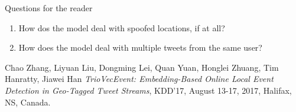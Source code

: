 \documentclass[12pt]{article}
\theoremstyle{remark}
\begin{document}
	Questions for the reader
	\begin{enumerate}
		\item How dos the model deal with spoofed locations, if at all?
		\item How does the model deal with multiple tweets from the same user?
	\end{enumerate}
	\vspace{0.5cm}
	
	\begin{thebibliography}{unsrt}
		Chao Zhang, Liyuan Liu, Dongming Lei, Quan Yuan, Honglei Zhuang, Tim Hanratty, Jiawei Han \emph{TrioVecEvent: Embedding-Based Online Local Event Detection
			in Geo-Tagged Tweet Streams}, KDD’17, August 13-17, 2017, Halifax, NS, Canada.
	\end{thebibliography}
	
\end{document}
